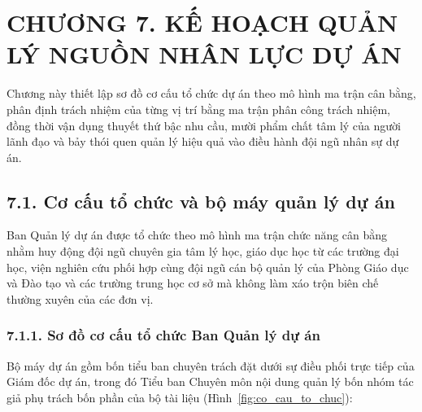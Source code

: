 \section{CHƯƠNG 7. KẾ HOẠCH QUẢN LÝ NGUỒN NHÂN LỰC DỰ ÁN}

Chương này thiết lập sơ đồ cơ cấu tổ chức dự án theo mô hình ma trận cân bằng, phân định trách nhiệm của từng vị trí bằng ma trận phân công trách nhiệm, đồng thời vận dụng thuyết thứ bậc nhu cầu, mười phẩm chất tâm lý của người lãnh đạo và bảy thói quen quản lý hiệu quả vào điều hành đội ngũ nhân sự dự án.

\subsection{7.1. Cơ cấu tổ chức và bộ máy quản lý dự án}

Ban Quản lý dự án được tổ chức theo mô hình ma trận chức năng cân bằng nhằm huy động đội ngũ chuyên gia tâm lý học, giáo dục học từ các trường đại học, viện nghiên cứu phối hợp cùng đội ngũ cán bộ quản lý của Phòng Giáo dục và Đào tạo và các trường trung học cơ sở mà không làm xáo trộn biên chế thường xuyên của các đơn vị.

\subsubsection{7.1.1. Sơ đồ cơ cấu tổ chức Ban Quản lý dự án}

Bộ máy dự án gồm bốn tiểu ban chuyên trách đặt dưới sự điều phối trực tiếp của Giám đốc dự án, trong đó Tiểu ban Chuyên môn nội dung quản lý bốn nhóm tác giả phụ trách bốn phần của bộ tài liệu (Hình~\ref{fig:co_cau_to_chuc}):

